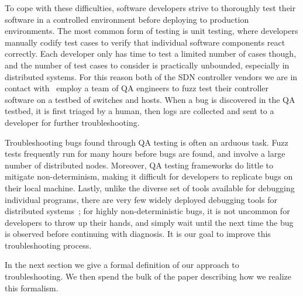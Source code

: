To cope with these difficulties, software developers strive to thoroughly test
their software in a controlled environment before deploying to
production environments. The most common form of testing is unit testing,
where developers manually codify test cases to verify that individual software
components react correctly. Each developer only has time to test a limited
number of cases though, and the number of test cases to consider is
practically unbounded, especially in
distributed systems. For this reason both of the SDN controller vendors we are
in contact with~\cite{nicirahomepage,bigswitch} employ a team of QA
engineers to fuzz test their controller software on a testbed of switches and hosts.
When a bug is discovered in the QA testbed, it is first triaged
by a human, then logs are collected and sent to a developer for further troubleshooting.

Troubleshooting bugs found through QA testing is often an arduous task.
Fuzz tests frequently run for many hours before bugs are found, and involve
a large number of distributed nodes. Moreover, QA testing frameworks do little to mitigate
non-determinism, making it difficult for developers to replicate bugs on their
local machine. Lastly, unlike the diverse set of tools available for debugging
individual programs, there are very few widely deployed debugging tools for
distributed systems~\cite{tooling_gap}; for highly non-deterministic bugs, it is not
uncommon for developers to throw
up their hands, and simply wait until the next time the bug is observed before
continuing with diagnosis. It is our goal to improve this troubleshooting
process.

In the next section we give a formal definition of our approach to
troubleshooting. We then spend
the bulk of the paper describing how we realize this formalism.


